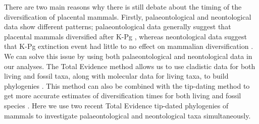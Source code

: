 \documentclass[12pt,letterpaper]{article}
\begin{document}
There are two main reasons why there is still debate about the timing of the diversification of placental mammals. 
Firstly, palaeontological and neontological data show different patterns; palaeontological data generally suggest that placental mammals diversified after K-Pg \citep[e.g.][]{OLeary08022013}, whereas neontological data suggest that K-Pg extinction event had little to no effect on mammalian diversification \citep{bininda2007delayed,meredithimpacts2011,Stadler12042011}.
We can solve this issue by using both palaeontological and neontological data in our analyses. 
The Total Evidence method allows us to use cladistic data for both living and fossil taxa, along with molecular data for living taxa, to build phylogenies \citep{ronquista2012}. %
This method can also be combined with the tip-dating method \citep{ronquista2012,Wood01032013} to get more accurate estimates of diversification times for both living and fossil species \citep[but see][]{Arcila2015131}.
Here we use two recent Total Evidence tip-dated phylogenies of mammals \citep{Slater2012MEE,beckancient2014} to investigate palaeontological and neontological taxa simultaneously.
\end{document}
